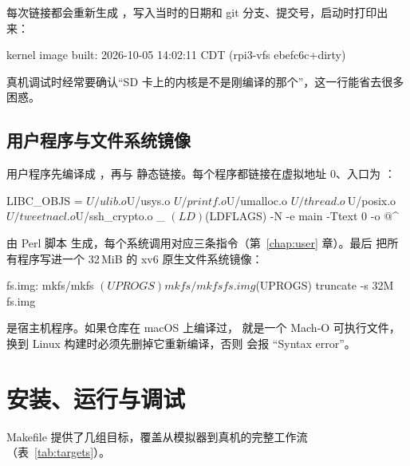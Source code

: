 每次链接都会重新生成 ，写入当时的日期和 git 分支、提交号，启动时打印出来：

\begin{txtcode}
kernel image built: 2026-10-05 14:02:11 CDT (rpi3-vfs ebefc6c+dirty)
\end{txtcode}

真机调试时经常要确认“SD 卡上的内核是不是刚编译的那个”，这一行能省去很多困惑。

\subsection{用户程序与文件系统镜像}

用户程序先编译成 ，再与  静态链接。每个程序都链接在虚拟地址 0、入口为 ：

\begin{makecode}
LIBC_OBJS = $U/ulib.o $U/usys.o $U/printf.o $U/umalloc.o $U/thread.o \
            $U/posix.o $U/tweetnacl.o $U/ssh_crypto.o
_%
	$(LD) $(LDFLAGS) -N -e main -Ttext 0 -o $@ $^
\end{makecode}

 由 Perl 脚本  生成，每个系统调用对应三条指令（第~\ref{chap:user} 章）。最后  把所有程序写进一个 32\,MiB 的 xv6 原生文件系统镜像：

\begin{makecode}
fs.img: mkfs/mkfs $(UPROGS)
	mkfs/mkfs fs.img $(UPROGS)
	truncate -s 32M fs.img
\end{makecode}

\begin{note}
   是宿主机程序。如果仓库在 macOS 上编译过， 就是一个 Mach-O 可执行文件，换到 Linux 构建时必须先删掉它重新编译，否则  会报 “Syntax error”。
\end{note}

\section{安装、运行与调试}

Makefile 提供了几组目标，覆盖从模拟器到真机的完整工作流（表~\ref{tab:targets}）。

